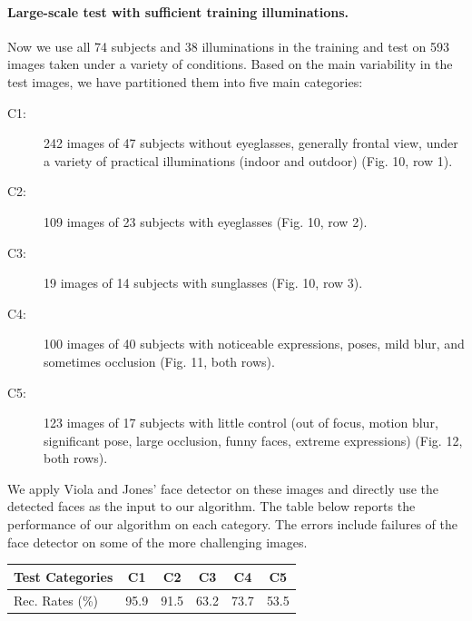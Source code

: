 \paragraph{Large-scale test with sufficient training illuminations.}
Now we use all 74 subjects and 38 illuminations in the training and test on 593 images taken under a variety of conditions. Based on the main variability in the test images, we have partitioned them into five main categories:%
\begin{small}
\begin{description}
\item[C1:] 242 images of 47 subjects without eyeglasses, generally frontal view, under a variety of practical illuminations (indoor and outdoor) (Fig. 10, row 1). %
\item[C2:] 109 images of 23 subjects with eyeglasses (Fig. 10, row 2).%
\item[C3:] 19 images of 14 subjects with sunglasses (Fig. 10, row 3).%
\item[C4:] 100 images of 40 subjects with noticeable expressions, poses, mild blur, and sometimes occlusion (Fig. 11, both rows).%
\item[C5:] 123 images of 17 subjects with little control (out of focus, motion blur, significant pose, large occlusion, funny faces, extreme expressions) (Fig. 12, both rows).%
\end{description}
\end{small}
We apply Viola and Jones' face detector on these images and directly use the detected faces as the input to our algorithm. The table below reports the performance of our algorithm on each category. The errors include failures of the face detector on some of the more challenging images.\vspace{0mm}
\begin{table}[h]	
\centering
\begin{tabular}{|l|c|c|c|c|c| }
\hline
Test Categories & C1 & C2 & C3 & C4 & C5  \\
\hline
\hline
Rec. Rates (\%) &  95.9 & 91.5 & 63.2 & 73.7 & 53.5 \\
\hline
\end{tabular} \vspace{0mm}
\end{table}

